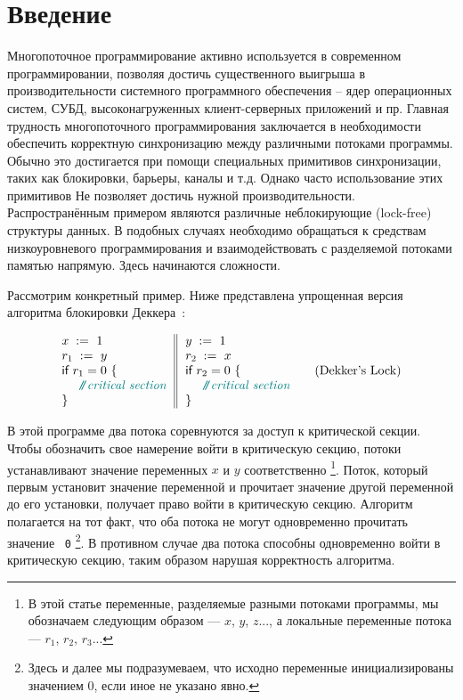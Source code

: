\section{Введение}
\label{sec:intro}

Многопоточное программирование активно используется в современном программировании, позволяя достичь существенного выигрыша в производительности системного программного обеспечения – ядер операционных систем, СУБД, высоконагруженных клиент-серверных приложений и пр.  Главная трудность многопоточного программирования 
заключается в необходимости обеспечить 
корректную синхронизацию между различными потоками программы. 
Обычно это достигается при помощи специальных 
примитивов синхронизации, 
таких как блокировки, барьеры, каналы и т.д. 
Однако часто использование этих примитивов 
Не позволяет достичь нужной производительности. 
Распространённым примером являются различные неблокирующие (lock-free) структуры данных.
В подобных случаях необходимо обращаться к средствам
низкоуровневого программирования и 
взаимодействовать с разделяемой потоками памятью напрямую.
Здесь начинаются сложности. 

Рассмотрим конкретный пример.
Ниже представлена упрощенная версия 
алгоритма блокировки Деккера~\cite{Dijkstra:68}:

\begin{equation*}
\inarrII{
\writeInst{}{x}{1} \\
\readInst{}{r_1}{y} \\
\kw{if} {r_1 = 0} ~\{ \\
~~ \comment{critical section} \\
\}
}{
\writeInst{}{y}{1} \\
\readInst{}{r_2}{x} \\
\kw{if} {r_2 = 0} ~\{ \\
~~ \comment{critical section} \\
\}
}
\tag{Dekker's Lock}\label{ex:Dekker}
\end{equation*}

В этой программе два потока соревнуются за доступ к критической секции.
Чтобы обозначить свое намерение войти в критическую секцию,
потоки устанавливают значение переменных $x$ и $y$ соответственно%
\footnote{В этой статье переменные, разделяемые разными потоками программы, мы обозначаем следующим образом ---
$x$, $y$, $z$..., а локальные переменные потока --- $r_1$, $r_2$, $r_3$...}.
Поток, который первым установит значение переменной и 
прочитает значение другой переменной до его установки,
получает право войти в критическую секцию.
Алгоритм полагается на тот факт, что оба 
потока не могут одновременно прочитать значение ~\texttt{0}%
\footnote{Здесь и далее мы подразумеваем, 
что исходно переменные инициализированы значением 0, если иное не указано явно.}.
В противном случае два потока способны одновременно 
войти в критическую секцию, таким образом нарушая корректность алгоритма. 

